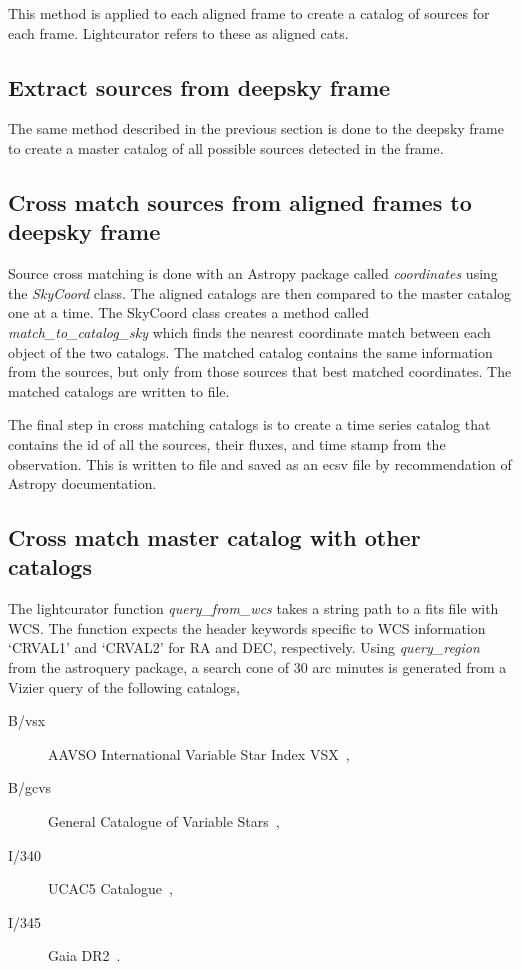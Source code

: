 This method is applied to each aligned frame to create a catalog
of sources for each frame.
Lightcurator refers to these as aligned cats.

\subsection{Extract sources from deepsky frame}
The same method described in the previous section is done to the
deepsky frame to create a master catalog of all
possible sources detected in the frame.

\subsection{Cross match sources from aligned frames to deepsky frame}
Source cross matching is done with an Astropy package
called \textit{coordinates} using the \textit{SkyCoord} class.
The aligned catalogs are then compared to the master catalog one at a time. 
The SkyCoord class creates a method called \textit{match\_to\_catalog\_sky}
which finds the nearest coordinate match between each 
object of the two catalogs.
The matched catalog contains the same information from the sources, but
only from those sources that best matched coordinates.
The matched catalogs are written to file.

The final step in cross matching catalogs is to create a time series
catalog that contains the id of all the sources, their fluxes, and 
time stamp from the observation.
This is written to file and saved as an ecsv file by recommendation
of Astropy documentation.

\subsection{Cross match master catalog with other catalogs}
The lightcurator function \textit{query\_from\_wcs} takes a string path
to a fits file with WCS\@.
The function expects the header keywords specific to WCS
information `CRVAL1' and `CRVAL2' for RA and DEC, respectively.
Using \textit{query\_region} from the astroquery package, a search cone of 30 arc minutes is generated
from a Vizier query of the following catalogs,
\begin{description}
    \item[B/vsx] AAVSO International Variable Star Index VSX~\cite{vsx}, 
    \item[B/gcvs] General Catalogue of Variable Stars~\cite{samus_2017},
    \item[I/340] UCAC5 Catalogue~\cite{ucac5},
    \item[I/345] Gaia DR2~\cite{gaia2}.
\end{description}

